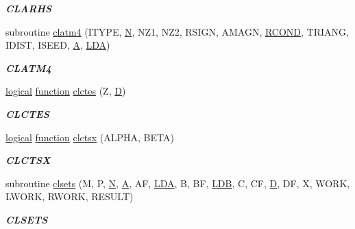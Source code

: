\begin{DoxyCompactItemize}
\begin{DoxyCompactList}\small\item\em {\bfseries C\+L\+A\+R\+H\+S} \end{DoxyCompactList}\item 
subroutine \hyperlink{group__complex__eig_ga30a0faa6bcbc4df466ebfab225b826a5}{clatm4} (I\+T\+Y\+P\+E, \hyperlink{polmisc_8c_a0240ac851181b84ac374872dc5434ee4}{N}, N\+Z1, N\+Z2, R\+S\+I\+G\+N, A\+M\+A\+G\+N, \hyperlink{superlu__enum__consts_8h_af00a42ecad444bbda75cde1b64bd7e72a9b5c151728d8512307565994c89919d5}{R\+C\+O\+N\+D}, T\+R\+I\+A\+N\+G, I\+D\+I\+S\+T, I\+S\+E\+E\+D, \hyperlink{classA}{A}, \hyperlink{example__user_8c_ae946da542ce0db94dced19b2ecefd1aa}{L\+D\+A})
\begin{DoxyCompactList}\small\item\em {\bfseries C\+L\+A\+T\+M4} \end{DoxyCompactList}\item 
\hyperlink{tnc_8c_aa7b64cdf39500931f7b333343791a104}{logical} \hyperlink{afunc_8m_a7b5e596df91eadea6c537c0825e894a7}{function} \hyperlink{group__complex__eig_ga90c4512d4a10ff8cc0050e0aaa112b5f}{clctes} (Z, \hyperlink{odrpack_8h_a7dae6ea403d00f3687f24a874e67d139}{D})
\begin{DoxyCompactList}\small\item\em {\bfseries C\+L\+C\+T\+E\+S} \end{DoxyCompactList}\item 
\hyperlink{tnc_8c_aa7b64cdf39500931f7b333343791a104}{logical} \hyperlink{afunc_8m_a7b5e596df91eadea6c537c0825e894a7}{function} \hyperlink{group__complex__eig_gaf2475404f498a9fc9f7146da5a6829ad}{clctsx} (A\+L\+P\+H\+A, B\+E\+T\+A)
\begin{DoxyCompactList}\small\item\em {\bfseries C\+L\+C\+T\+S\+X} \end{DoxyCompactList}\item 
subroutine \hyperlink{group__complex__eig_ga5e6951c28a4f982e487adfaf3fc6c989}{clsets} (M, P, \hyperlink{polmisc_8c_a0240ac851181b84ac374872dc5434ee4}{N}, \hyperlink{classA}{A}, A\+F, \hyperlink{example__user_8c_ae946da542ce0db94dced19b2ecefd1aa}{L\+D\+A}, B, B\+F, \hyperlink{example__user_8c_a50e90a7104df172b5a89a06c47fcca04}{L\+D\+B}, C, C\+F, \hyperlink{odrpack_8h_a7dae6ea403d00f3687f24a874e67d139}{D}, D\+F, X, W\+O\+R\+K, L\+W\+O\+R\+K, R\+W\+O\+R\+K, R\+E\+S\+U\+L\+T)
\begin{DoxyCompactList}\small\item\em {\bfseries C\+L\+S\+E\+T\+S} \end{DoxyCompactList}\item 

\end{DoxyCompactItemize}
